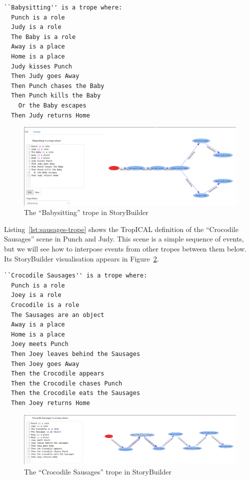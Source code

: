 \documentclass[11pt]{report}
\begin{document}
\begin{lstlisting}[label={lst:babysitting-trope},caption={The ``Babysitting'' trope}]
``Babysitting'' is a trope where:
  Punch is a role
  Judy is a role
  The Baby is a role
  Away is a place
  Home is a place
  Judy kisses Punch
  Then Judy goes Away
  Then Punch chases the Baby
  Then Punch kills the Baby
    Or the Baby escapes
  Then Judy returns Home
\end{lstlisting}

\begin{figure}[!h]
\centerline{\includegraphics[width=\textwidth]{babysitting-trope.png}}
\caption{The ``Babysitting'' trope in StoryBuilder}\label{fig:babysitting-trope}
\end{figure}

Listing~\ref{lst:sausages-trope} shows the TropICAL definition of the
``Crocodile Sausages'' scene in Punch and Judy. This scene is a simple sequence
of events, but we will see how to interpose events from other tropes between
them below. Its StoryBuilder visualisation appears in Figure~\ref{fig:crocodile-sausages}.

\begin{lstlisting}[label={lst:sausages-trope},caption={The ``Crocodile Sausages'' trope}]
``Crocodile Sausages'' is a trope where:
  Punch is a role
  Joey is a role
  Crocodile is a role
  The Sausages are an object
  Away is a place
  Home is a place
  Joey meets Punch
  Then Joey leaves behind the Sausages
  Then Joey goes Away
  Then the Crocodile appears
  Then the Crocodile chases Punch
  Then the Crocodile eats the Sausages
  Then Joey returns Home
\end{lstlisting}

\begin{figure}[!h]
\centerline{\includegraphics[width=\textwidth]{crocodile-trope.png}}
\caption{The ``Crocodile Sausages'' trope in StoryBuilder}\label{fig:crocodile-sausages}
\end{figure}
\end{document}
